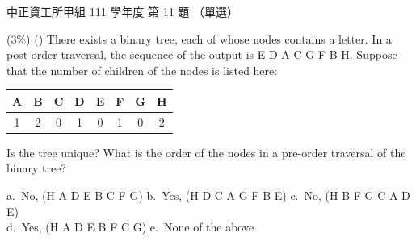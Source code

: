 \begin{pastexam}[label={px:ccu-111-swa-03}]{中正資工所甲組 111 學年度 第 11 題}
（單選）

(3\%) (\quad) There exists a binary tree, each of whose nodes contains a letter. In a
post-order traversal, the sequence of the output is E D A C G F B H. Suppose that the number of
children of the nodes is listed here:
\begin{center}
\begin{tabular}{|c|c|c|c|c|c|c|c|}
\hline
A & B & C & D & E & F & G & H\\ \hline
1 & 2 & 0 & 1 & 0 & 1 & 0 & 2\\ \hline
\end{tabular}
\end{center}
Is the tree unique? What is the order of the nodes in a pre-order traversal of the binary tree?

a.~No, (H A D E B C F G) \qquad b.~Yes, (H D C A G F B E) \qquad c.~No, (H B F G C A D E)\\
d.~Yes, (H A D E B F C G) \qquad e.~None of the above
\end{pastexam}


